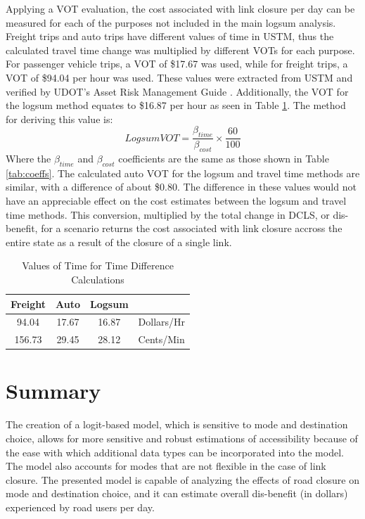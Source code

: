 Applying a VOT evaluation, the cost associated with link
closure per day can be measured for each of the purposes not included in
the main logsum analysis. Freight trips and auto trips have different
values of time in USTM, thus the calculated travel time change was
multiplied by different VOTs for each purpose. For passenger vehicle
trips, a VOT of \$17.67 was used, while for freight trips, a VOT of
\$94.04 per hour was used. These values were extracted from USTM and
verified by UDOT's Asset Risk Management Guide \citep{UtahDepartmentofTransportation2020}.
Additionally, the VOT for the logsum method equates to \$16.87 per hour as seen in
Table \ref{tab:VOT}. The method for deriving this value is:
\begin{equation}
  Logsum VOT = \frac{\beta_{time}}{\beta_{cost}} \times \frac{60}{100}
  \label{eqn:cost}
\end{equation}
Where the $\beta_{time}$ and $\beta_{cost}$ coefficients are the same as those
shown in Table \ref{tab:coeffs}. The calculated auto VOT for the logsum and
travel time methods are similar, with a difference
of about \$0.80. The difference in these values would not have an appreciable effect
on the cost estimates between the logsum and travel time methods. This conversion,
multiplied by the total change in DCLS, or dis-benefit, for a scenario returns the cost
associated with link closure accross the entire state as a result of the closure of a single link.

\begin{table}
\caption{\label{tab:VOT}Values of Time for Time Difference Calculations}
\centering
\begin{tabular}[t]{cccl}
\toprule
Freight & Auto & Logsum\\
\midrule
94.04 & 17.67 & 16.87 & Dollars/Hr\\
156.73 & 29.45 & 28.12 & Cents/Min\\
\bottomrule
\end{tabular}
\end{table}

\section{Summary}

The creation of a logit-based model, which is sensitive to mode and destination
choice, allows for more sensitive and robust estimations of accessibility because
of the ease with which additional data types can be incorporated into the model. The
model also accounts for modes that are not flexible in the case of link
closure. The presented model is capable of analyzing the effects of
road closure on mode and destination choice, and it can estimate overall
dis-benefit (in dollars) experienced by road users per day.
